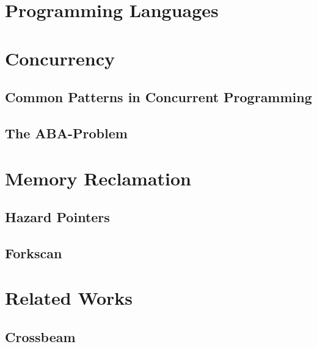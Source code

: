 \section{Programming Languages\label{sec:background-pl}}
\lorem{}


\section{Concurrency}
\lorem{}

\subsection{Common Patterns in Concurrent Programming\label{sec:common-patterns}}
\lorem{}

\subsection{The ABA-Problem\label{sec:aba-problem}}


\section{Memory Reclamation}
\lorem{}

\subsection{Hazard Pointers\label{sec:hazard-pointers}}
\lorem{}

\subsection{Forkscan\label{sec:forkscan}}
\lorem{}


\section{Related Works}
\lorem{}

\subsection{Crossbeam}
\lorem{}
